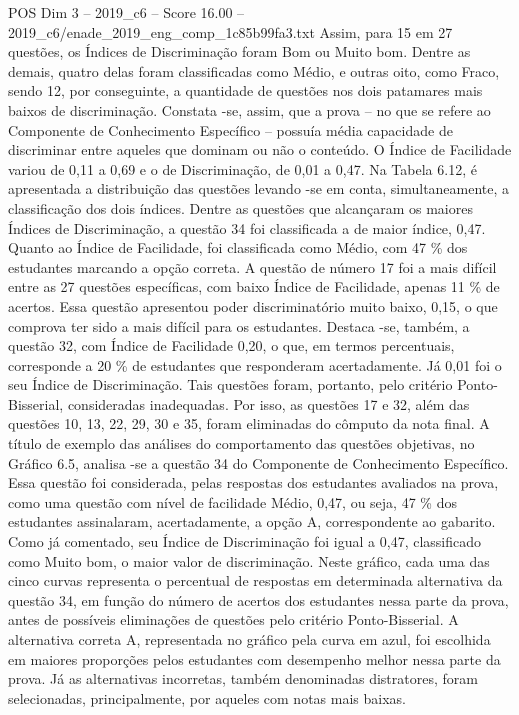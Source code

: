 \begin{textsample}{POS Dim 3 – 2019\_c6 – Score 16.00 – 2019\_c6/enade\_2019\_eng\_comp\_1c85b99fa3.txt}
Assim, para 15 em 27 questões, os Índices de Discriminação foram Bom ou Muito bom.
Dentre as demais, quatro delas foram classificadas como Médio, e outras oito, como Fraco, sendo 12, por conseguinte, a quantidade de questões nos dois patamares mais baixos de discriminação.
Constata -se, assim, que a prova – no que se refere ao Componente de Conhecimento Específico – possuía média capacidade de discriminar entre aqueles que dominam ou não o conteúdo.
O Índice de Facilidade variou de 0,11 a 0,69 e o de Discriminação, de 0,01 a 0,47.
Na Tabela 6.12, é apresentada a distribuição das questões levando -se em conta, simultaneamente, a classificação dos dois índices.
Dentre as questões que alcançaram os maiores Índices de Discriminação, a questão 34 foi classificada a de maior índice, 0,47.
Quanto ao Índice de Facilidade, foi classificada como Médio, com 47 \% dos estudantes marcando a opção correta.
A questão de número 17 foi a mais difícil entre as 27 questões específicas, com baixo Índice de Facilidade, apenas 11 \% de acertos.
Essa questão apresentou poder discriminatório muito baixo, 0,15, o que comprova ter sido a mais difícil para os estudantes.
Destaca -se, também, a questão 32, com Índice de Facilidade 0,20, o que, em termos percentuais, corresponde a 20 \% de estudantes que responderam acertadamente.
Já 0,01 foi o seu Índice de Discriminação.
Tais questões foram, portanto, pelo critério Ponto-Bisserial, consideradas inadequadas.
Por isso, as questões 17 e 32, além das questões 10, 13, 22, 29, 30 e 35, foram eliminadas do cômputo da nota final.
A título de exemplo das análises do comportamento das questões objetivas, no Gráfico 6.5, analisa -se a questão 34 do Componente de Conhecimento Específico.
Essa questão foi considerada, pelas respostas dos estudantes avaliados na prova, como uma questão com nível de facilidade Médio, 0,47, ou seja, 47 \% dos estudantes assinalaram, acertadamente, a opção A, correspondente ao gabarito.
Como já comentado, seu Índice de Discriminação foi igual a 0,47, classificado como Muito bom, o maior valor de discriminação.
Neste gráfico, cada uma das cinco curvas representa o percentual de respostas em determinada alternativa da questão 34, em função do número de acertos dos estudantes nessa parte da prova, antes de possíveis eliminações de questões pelo critério Ponto-Bisserial.
A alternativa correta A, representada no gráfico pela curva em azul, foi escolhida em maiores proporções pelos estudantes com desempenho melhor nessa parte da prova.
Já as alternativas incorretas, também denominadas distratores, foram selecionadas, principalmente, por aqueles com notas mais baixas.

\end{textsample}

